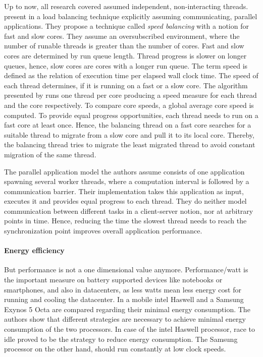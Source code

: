 Up to now, all research covered assumed independent, non-interacting threads.
\citeauthor{hofmeyr_load_2010} present in \cite{hofmeyr_load_2010} a load
balancing technique explicitly assuming communicating, parallel applications.
They propose a technique called \emph{speed balancing} with a notion for fast
and slow cores.
They assume an oversubscribed environment, where the number of runable threads
is greater than the number of cores.
Fast and slow cores are determined by run queue length.
Thread progress is slower on longer queues, hence, slow cores are cores with a
longer run queue.
The term speed is defined as the relation of execution time per elapsed wall
clock time.
The speed of each thread determines, if it is running on a fast or a slow core.
The algorithm presented by \citeauthor{hofmeyr_load_2010} runs one thread per
core producing a speed measure for each thread and the core respectively.
To compare core speeds, a global average core speed is computed.
To provide equal progress opportunities, each thread needs to run on a fast
core at least once.
Hence, the balancing thread on a fast core searches for a suitable thread to
migrate from a slow core and pull it to its local core.
Thereby, the balancing thread tries to migrate the least migrated thread to
avoid constant migration of the same thread.

The parallel application model the authors assume consists of one application
spawning several worker threads, where a computation interval is followed by a
communication barrier.
Their implementation takes this application as input, executes it and provides
equal progress to each thread.
They do neither model communication between different tasks in a client-server
notion, nor at arbitrary points in time.
Hence, reducing the time the slowest thread needs to reach the synchronization
point improves overall application performance.
\\

\paragraph{Energy efficiency}
But performance is not a one dimensional value anymore.
Performance/watt is the important measure on battery supported devices like
notebooks or smartphones, and also in datacenters, as less watts mean less
energy cost for running and cooling the datacenter.
In \cite{imes_poet_2015} a mobile \gls{intel} Haswell and a Samsung Exynos 5 Octa are
compared regarding their minimal energy consumption.
The authors show that different strategies are necessary to achieve minimal
energy consumption of the two processors.
In case of the \gls{intel} Haswell processor, race to idle proved to be the
strategy to reduce energy consumption.
The Samsung processor on the other hand, should run constantly at low clock
speeds.

